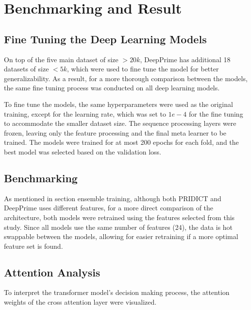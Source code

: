 \chapter{Benchmarking and Result}

\section{Fine Tuning the Deep Learning Models}

On top of the five main dataset of size $> 20k$, DeepPrime has additional 18 datasets of size $<5k$, which were used to fine tune the model for better generalizability. As a result, for a more thorough comparison between the models, the same fine tuning process was conducted on all deep learning models.

To fine tune the models, the same hyperparameters were used as the original training, except for the learning rate, which was set to $1e-4$ for the fine tuning to accommodate the smaller dataset size. The sequence processing layers were frozen, leaving only the feature processing and the final meta learner to be trained. The models were trained for at most 200 epochs for each fold, and the best model was selected based on the validation loss.

\section{Benchmarking}

As mentioned in section {ensemble training}, although both PRIDICT and DeepPrime uses different features, for a more direct comparison of the architecture, both models were retrained using the features selected from this study. Since all models use the same number of features (24), the data is hot swappable between the models, allowing for easier retraining if a more optimal feature set is found.

\section{Attention Analysis}
\label{sec:attention_analysis}

To interpret the transformer model's decision making process, the attention weights of the cross attention layer were visualized. 